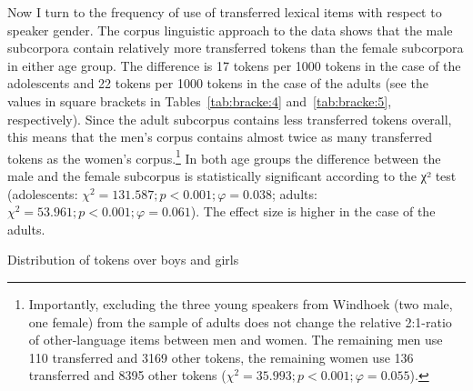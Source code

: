 \documentclass[output=paper]{langsci/langscibook}
\begin{document}
Now I turn to the frequency of use of transferred lexical items with respect to speaker gender. The corpus linguistic approach to the data shows that the male subcorpora contain relatively more transferred tokens than the female subcorpora in either age group. The difference is 17 tokens per 1000 tokens in the case of the adolescents and 22 tokens per 1000 tokens in the case of the adults (see the values in square brackets in Tables~\ref{tab:bracke:4} and~\ref{tab:bracke:5}, respectively). Since the adult subcorpus contains less transferred tokens overall, this means that the men’s corpus contains almost twice as many transferred tokens as the women’s corpus.\footnote{Importantly, excluding the three young speakers from Windhoek (two male, one female) from the sample of adults does not change the relative 2:1-ratio of other-language items between men and women. The remaining men use 110 transferred and 3169 other tokens, the remaining women use 136 transferred and 8395 other tokens ($\chi^2 = 35.993; p < 0.001; \varphi = 0.055$).} In both age groups the difference between the male and the female subcorpus is statistically significant according to the χ² test (adolescents: $\chi^2 = 131.587; p < 0.001; \varphi = 0.038$; adults: $\chi^2 = 53.961; p < 0.001; \varphi = 0.061$). The effect size is higher in the case of the adults.

\begin{table}
\begin{floatrow}\captionsetup{margin=.1\textwidth}
{\caption{Distribution of tokens over boys and girls\label{tab:bracke:4}}}%
{\caption{Distribution of tokens over men and women\label{tab:bracke:5}}}
\end{floatrow}
\end{table}  
\end{document}
